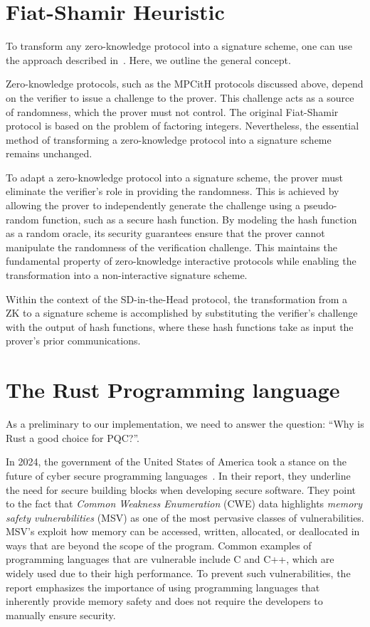\documentclass[11pt]{report}
\theoremstyle{definition}
\theoremstyle{plain}
\begin{document}
\section{Fiat-Shamir Heuristic}\label{sec:fiatshamir}
To transform any zero-knowledge protocol into a signature scheme, one can use the approach described in~\cite{fiat1986prove}. Here, we outline the general concept.

Zero-knowledge protocols, such as the MPCitH protocols discussed above, depend on the verifier to issue a challenge to the prover. This challenge acts as a source of randomness, which the prover must not control. The original Fiat-Shamir protocol is based on the problem of factoring integers. Nevertheless, the essential method of transforming a zero-knowledge protocol into a signature scheme remains unchanged.

To adapt a zero-knowledge protocol into a signature scheme, the prover must eliminate the verifier's role in providing the randomness. This is achieved by allowing the prover to independently generate the challenge using a pseudo-random function, such as a secure hash function. By modeling the hash function as a random oracle, its security guarantees ensure that the prover cannot manipulate the randomness of the verification challenge. This maintains the fundamental property of zero-knowledge interactive protocols while enabling the transformation into a non-interactive signature scheme.

Within the context of the SD-in-the-Head protocol, the transformation from a ZK to a signature scheme is accomplished by substituting the verifier's challenge with the output of hash functions, where these hash functions take as input the prover's prior communications.

\section{The Rust Programming language}\label{sec:rust}
As a preliminary to our implementation, we need to answer the question: ``Why is Rust a good choice for PQC?''.

In 2024, the government of the United States of America took a stance on the future of cyber secure programming languages~\cite{whitehouse2024memorysafe}. In their report, they underline the need for secure building blocks when developing secure software. They point to the fact that \textit{Common Weakness Enumeration} (CWE) data highlights \textit{memory safety vulnerabilities} (MSV) as one of the most pervasive classes of vulnerabilities. MSV's exploit how memory can be accessed, written, allocated, or deallocated in ways that are beyond the scope of the program. Common examples of programming languages that are vulnerable include C and C++, which are widely used due to their high performance. To prevent such vulnerabilities, the report emphasizes the importance of using programming languages that inherently provide memory safety and does not require the developers to manually ensure security.
\end{document}
